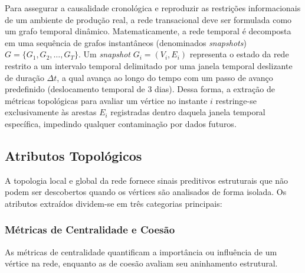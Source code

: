 \documentclass[titlepage,a4paper,oneside,onecolumn,12pt]{report}
\begin{document}
Para assegurar a causalidade cronológica e reproduzir as restrições informacionais de um ambiente de produção real, a rede transacional deve ser formulada como um grafo temporal dinâmico. Matematicamente, a rede temporal é decomposta em uma sequência de grafos instantâneos (denominados \textit{snapshots}) $G = \{G_1, G_2, \ldots, G_T\}$. Um \textit{snapshot} $G_i = (V_i, E_i)$ representa o estado da rede restrito a um intervalo temporal delimitado por uma janela temporal deslizante de duração $\Delta t$, a qual avança ao longo do tempo com um passo de avanço predefinido (deslocamento temporal de 3 dias). Dessa forma, a extração de métricas topológicas para avaliar um vértice no instante $i$ restringe-se exclusivamente às arestas $E_i$ registradas dentro daquela janela temporal específica, impedindo qualquer contaminação por dados futuros.

\subsection{Atributos Topológicos}
A topologia local e global da rede fornece sinais preditivos estruturais que não podem ser descobertos quando os vértices são analisados de forma isolada. Os atributos extraídos dividem-se em três categorias principais:

\subsubsection{Métricas de Centralidade e Coesão}
As métricas de centralidade quantificam a importância ou influência de um vértice na rede, enquanto as de coesão avaliam seu aninhamento estrutural.
\end{document}
